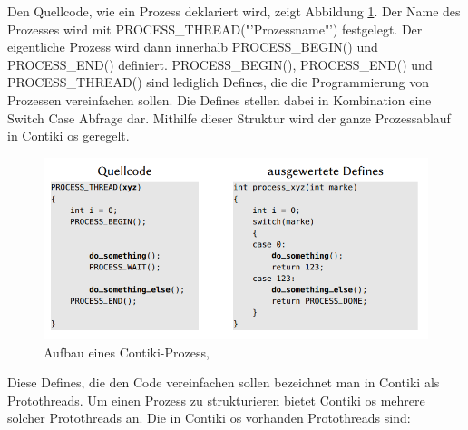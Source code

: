 	Den Quellcode, wie ein Prozess deklariert wird, zeigt Abbildung \ref{ContikiProzess}. Der Name des Prozesses wird mit PROCESS\_THREAD("'Prozessname"') festgelegt. Der eigentliche Prozess wird dann innerhalb PROCESS\_BEGIN() und PROCESS\_END() definiert. PROCESS\_BEGIN(), PROCESS\_END() und PROCESS\_THREAD() sind lediglich Defines, die die Programmierung von Prozessen vereinfachen sollen. Die Defines stellen dabei in Kombination eine Switch Case Abfrage dar. Mithilfe dieser Struktur wird der ganze Prozessablauf in Contiki \ac{os} geregelt.
	\begin{figure}
		\centering
		\includegraphics[scale=0.5]{Grafiken-Julian/Contiki_Prozess.png}
		\caption{Aufbau eines Contiki-Prozess, \cite[S.9]{ausgewertetedefines}}
		\label{ContikiProzess}
	\end{figure}
	Diese Defines, die den Code vereinfachen sollen bezeichnet man in Contiki als Protothreads. Um einen Prozess zu strukturieren bietet Contiki \ac{os} mehrere solcher Protothreads an. Die in Contiki \ac{os} vorhanden Protothreads sind:
	
